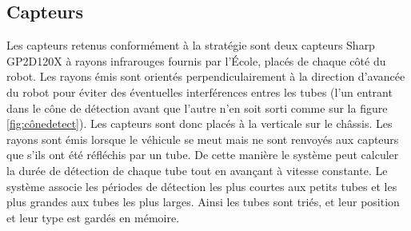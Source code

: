 \documentclass[a4paper,11pt]{article}
\begin{document}
\subsection{Capteurs\label{capteurs}}

Les capteurs retenus conformément à la stratégie sont deux capteurs Sharp GP2D120X à rayons infrarouges \cite{captdist} fournis par l'École, placés de chaque côté du robot. Les rayons émis sont orientés perpendiculairement à la direction d'avancée du robot pour éviter des éventuelles interférences entres les tubes (l'un entrant dans le cône de détection avant que l'autre n'en soit sorti comme sur la figure \ref{fig:cônedetect}). Les capteurs sont donc placés à la verticale sur le châssis. Les rayons sont émis lorsque le véhicule se meut mais ne sont renvoyés aux capteurs que s'ils ont été réfléchis par un tube. De cette manière le système peut calculer la durée de détection de chaque tube tout en avançant à vitesse constante. Le système associe les périodes de détection les plus courtes aux petits tubes et les plus grandes aux tubes les plus larges. Ainsi les tubes sont triés, et leur position et leur type est gardés en mémoire.
\end{document}
